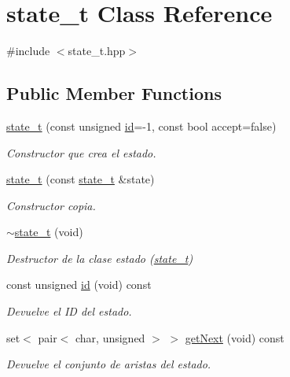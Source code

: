 \hypertarget{classstate__t}{}\section{state\+\_\+t Class Reference}
\label{classstate__t}


{\ttfamily \#include $<$state\+\_\+t.\+hpp$>$}

\subsection*{Public Member Functions}
\begin{DoxyCompactItemize}
\item 
\hyperlink{classstate__t_a424022379fa10074d6871d6123c8f320}{state\+\_\+t} (const unsigned \hyperlink{classstate__t_ade808c541a78e337c021020842e3c21d}{id}=-\/1, const bool accept=false)
\begin{DoxyCompactList}\small\item\em Constructor que crea el estado. \end{DoxyCompactList}\item 
\hyperlink{classstate__t_a0927d11d7e1113c51d090e7261c41ed3}{state\+\_\+t} (const \hyperlink{classstate__t}{state\+\_\+t} \&state)
\begin{DoxyCompactList}\small\item\em Constructor copia. \end{DoxyCompactList}\item 
\hyperlink{classstate__t_af27723c21f5cbdbdc237e4bd7aaff2ed}{$\sim$state\+\_\+t} (void)
\begin{DoxyCompactList}\small\item\em Destructor de la clase estado (\hyperlink{classstate__t}{state\+\_\+t}) \end{DoxyCompactList}\item 
const unsigned \hyperlink{classstate__t_ade808c541a78e337c021020842e3c21d}{id} (void) const
\begin{DoxyCompactList}\small\item\em Devuelve el ID del estado. \end{DoxyCompactList}\item 
set$<$ pair$<$ char, unsigned $>$ $>$ \hyperlink{classstate__t_a2ab5aaf45f890ade849fc87a0da80f6a}{get\+Next} (void) const
\begin{DoxyCompactList}\small\item\em Devuelve el conjunto de aristas del estado. \end{DoxyCompactList}\item 

\end{DoxyCompactItemize}

